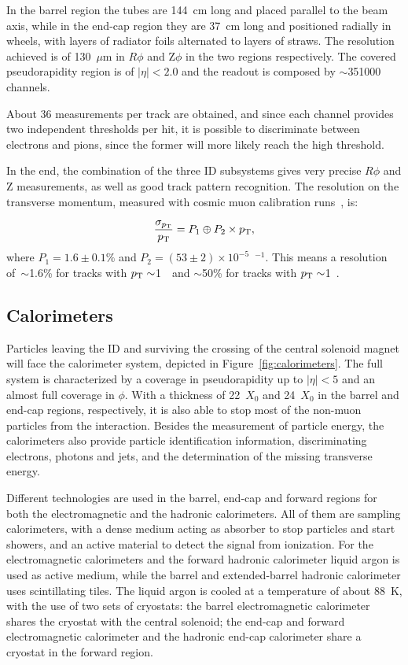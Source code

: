 In the barrel region the tubes are 144~cm long and placed parallel to the beam axis, while in the 
end-cap region they are 37~cm long and positioned radially in wheels, with layers of radiator foils alternated 
to layers of straws. The resolution achieved is of 130~$\mu$m in $R\phi$ and Z$\phi$  in the two regions respectively.
The covered pseudorapidity region is of $|\eta|<2.0$ and the readout is composed by $\sim$351000 channels.

About 36 measurements per track are obtained, and since each channel provides two independent thresholds per hit,
it is possible to discriminate between electrons and pions, since the former will more likely reach the
high threshold.

In the end, the combination of the three ID subsystems gives very precise $R\phi$ and Z measurements, as well as good track pattern recognition.
The resolution on the transverse momentum, measured with cosmic muon calibration runs~\cite{id_cosmic}, is:

\begin{equation}\label{eq:momentumres}
\frac{\sigma_{\pt}}{\pt}=P_1 \oplus P_2 \times \pt,
	\end{equation}
where $P_1=1.6\pm0.1\%$ and $P_2=(53\pm2)\times10^{-5}$~\GeV$^{-1}$. This means a 
resolution of~$\sim$1.6\% for tracks with $\pt\sim$1~\GeV\ and 
$\sim$50\% for tracks with $\pt\sim$1~\tev.


\subsection{Calorimeters}\label{sec:calo}

Particles leaving the ID and surviving the crossing of the central solenoid magnet
will face the calorimeter system, depicted in Figure~\ref{fig:calorimeters}.
The full system is characterized by a coverage
in pseudorapidity up to $|\eta|<5$ and an almost full coverage in $\phi$. With 
a thickness of 22~$X_0$ and 24~$X_0$ %
in the barrel and end-cap regions, respectively, 
it is also able to stop most of the non-muon particles from the interaction.
Besides the measurement of particle energy,
the calorimeters also provide particle identification
information, discriminating electrons, photons and jets, and the determination
of the missing transverse energy.

Different technologies are used in the barrel, end-cap and forward regions for both the
electromagnetic and the hadronic calorimeters. All of them are sampling calorimeters,
with a dense medium acting as absorber to stop particles and start showers, and an
active material to detect the signal from ionization. For the electromagnetic calorimeters
and the forward hadronic calorimeter liquid argon is used as active medium, while the
barrel and extended-barrel hadronic calorimeter uses scintillating tiles.
The liquid argon is cooled at a temperature of about 88~K, with the use of two sets of cryostats:
the barrel electromagnetic calorimeter shares the cryostat with the central solenoid;
the end-cap and forward electromagnetic calorimeter and the hadronic end-cap calorimeter
share a cryostat in the forward region.


